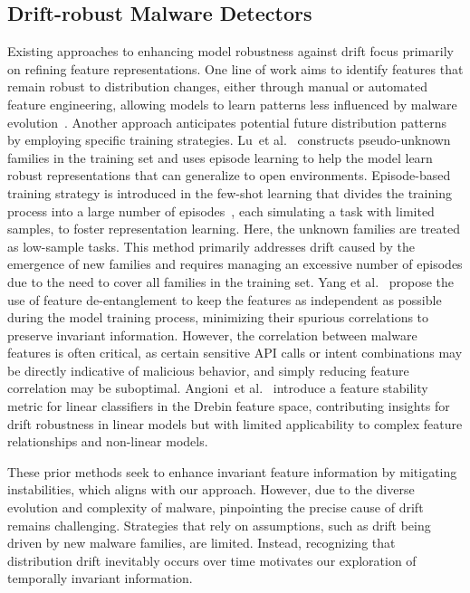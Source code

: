 \subsection{Drift-robust Malware Detectors}
Existing approaches to enhancing model robustness against drift focus primarily on refining feature representations. One line of work aims to identify features that remain robust to distribution changes, either through manual or automated feature engineering, allowing models to learn patterns less influenced by malware evolution~\cite{apigraph}. Another approach anticipates potential future distribution patterns by employing specific training strategies. Lu~et al.~\cite{DOMR} constructs pseudo-unknown families in the training set and uses episode learning to help the model learn robust representations that can generalize to open environments. Episode-based training strategy is introduced in the few-shot learning that divides the training process into a large number of episodes~\cite{episode_learning_1, episode_learning_2}, each simulating a task with limited samples, to foster representation learning. Here, the unknown families are treated as low-sample tasks. This method primarily addresses drift caused by the emergence of new families and requires managing an excessive number of episodes due to the need to cover all families in the training set. Yang et al.~\cite{scrr} propose the use of feature de-entanglement to keep the features as independent as possible during the model training process, minimizing their spurious correlations to preserve invariant information. However, the correlation between malware features is often critical, as certain sensitive API calls or intent combinations may be directly indicative of malicious behavior, and simply reducing feature correlation may be suboptimal. Angioni~et al.~\cite{svm_ce} introduce a feature stability metric for linear classifiers in the Drebin feature space, contributing insights for drift robustness in linear models but with limited applicability to complex feature relationships and non-linear models.

These prior methods seek to enhance invariant feature information by mitigating instabilities, which aligns with our approach. However, due to the diverse evolution and complexity of malware, pinpointing the precise cause of drift remains challenging. Strategies that rely on assumptions, such as drift being driven by new malware families, are limited. Instead, recognizing that distribution drift inevitably occurs over time motivates our exploration of temporally invariant information.

